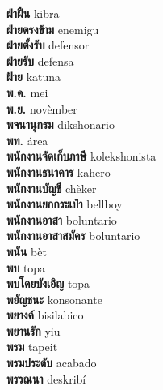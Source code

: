 \textbf{ ฝ่าฝืน  } kibra \\
\textbf{ ฝ่ายตรงข้าม  } enemigu \\
\textbf{ ฝ่ายตั้งรับ  } defensor \\
\textbf{ ฝ่ายรับ  } defensa \\
\textbf{ ฝ้าย  } katuna \\
\textbf{ พ.ค.  } mei \\
\textbf{ พ.ย.  } novèmber \\
\textbf{ พจนานุกรม  } dikshonario \\
\textbf{ พท.  } área \\
\textbf{ พนักงานจัดเก็บภาษี  } kolekshonista \\
\textbf{ พนักงานธนาคาร  } kahero \\
\textbf{ พนักงานบัญชี  } chèker \\
\textbf{ พนักงานยกกระเป๋า  } bellboy \\
\textbf{ พนักงานอาสา  } boluntario \\
\textbf{ พนักงานอาสาสมัคร  } boluntario \\
\textbf{ พนัน  } bèt \\
\textbf{ พบ  } topa \\
\textbf{ พบโดยบังเอิญ  } topa \\
\textbf{ พยัญชนะ  } konsonante \\
\textbf{ พยางค์  } bisilabico \\
\textbf{ พยานรัก  } yiu \\
\textbf{ พรม  } tapeit \\
\textbf{ พรมประดับ  } acabado \\
\textbf{ พรรณนา  } deskribí \\
